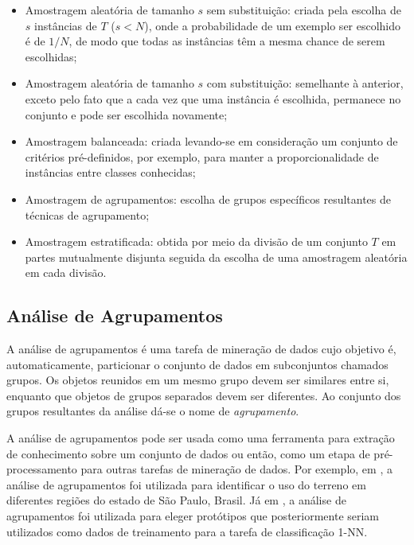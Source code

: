 \begin{itemize}
    \item Amostragem aleatória de tamanho $s$ sem substituição: criada pela escolha de $s$ instâncias de $T$ ($s < N$), onde a probabilidade de um exemplo ser escolhido é de $1/N$, de modo que todas as instâncias têm a mesma chance de serem escolhidas;
    
    \item Amostragem aleatória de tamanho $s$ com substituição: semelhante à anterior, exceto pelo fato que a cada vez que uma instância é escolhida, permanece no conjunto e pode ser escolhida novamente;
    
    \item Amostragem balanceada: criada levando-se em consideração um conjunto de critérios pré-definidos, por exemplo, para manter a proporcionalidade de instâncias entre classes conhecidas;
    
    \item Amostragem de agrupamentos: escolha de grupos específicos resultantes de técnicas de agrupamento;
    
    \item Amostragem estratificada: obtida por meio da divisão de um conjunto $T$ em partes mutualmente disjunta seguida da escolha de uma amostragem aleatória em cada divisão.
\end{itemize}




\subsection{Análise de Agrupamentos}
	\label{subsec:analise_agrupamentos}
	
A análise de agrupamentos é uma tarefa de mineração de dados cujo objetivo é,
automaticamente, particionar o conjunto de dados em subconjuntos chamados
grupos. Os objetos reunidos em um mesmo grupo devem ser similares entre si,
enquanto que objetos de grupos separados devem ser diferentes. Ao conjunto dos
grupos resultantes da análise dá-se o nome de \emph{agrupamento}.

A análise de agrupamentos pode ser usada como uma ferramenta para extração de
conhecimento sobre um conjunto de dados ou então, como um etapa de
pré-processamento para outras tarefas de mineração de dados. Por exemplo, em
\cite{gonccalves2014land}, a análise de agrupamentos foi utilizada para
identificar o uso do terreno em diferentes regiões do estado de São Paulo,
Brasil. Já em \cite{petitjean2014dynamic}, a análise de agrupamentos foi
utilizada para eleger protótipos que posteriormente seriam utilizados como dados
de treinamento para a tarefa de classificação 1-NN.

